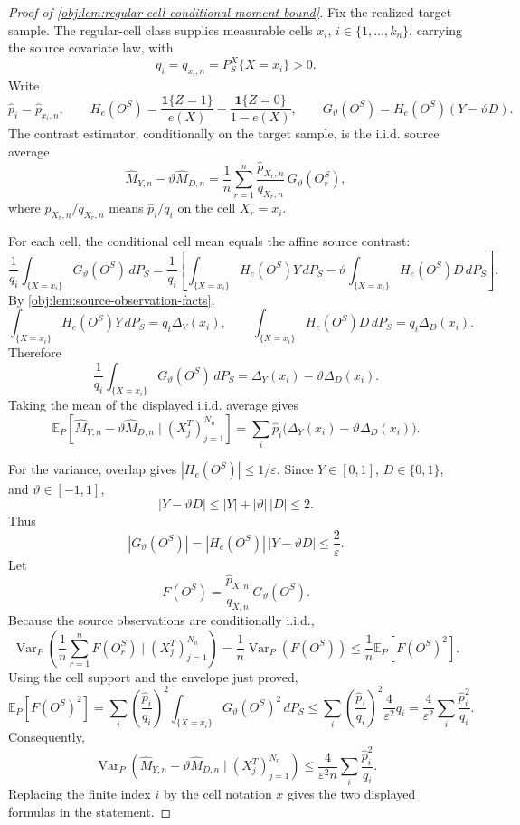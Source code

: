 \documentclass[11pt]{article}
\begin{document}
\begin{proof}[Proof of \cref{obj:lem:regular-cell-conditional-moment-bound}]
Fix the realized target sample. The regular-cell class supplies measurable cells \(x_i\), \(i\in\{1,\ldots,k_n\}\), carrying the source covariate law, with
\[
q_i=q_{x_i,n}=P_S^X\{X=x_i\}>0 .
\] %
Write
\[
\widehat p_i=\widehat p_{x_i,n},
\qquad
H_e(O^S)=\frac{\mathbf 1\{Z=1\}}{e(X)}
-\frac{\mathbf 1\{Z=0\}}{1-e(X)},
\qquad
G_\vartheta(O^S)=H_e(O^S)(Y-\vartheta D).
\]
The contrast estimator, conditionally on the target sample, is the i.i.d. source average
\[
\widehat M_{Y,n}-\vartheta\widehat M_{D,n}
=
\frac1n\sum_{r=1}^n
\frac{\widehat p_{X_r,n}}{q_{X_r,n}}\,
G_\vartheta(O_r^S),
\]
where \(\widehat p_{X_r,n}/q_{X_r,n}\) means \(\widehat p_i/q_i\) on the cell \(X_r=x_i\). %

For each cell, the conditional cell mean equals the affine source contrast:
\[
\frac1{q_i}
\int_{\{X=x_i\}}G_\vartheta(O^S)\,dP_S
=
\frac1{q_i}
\left[
\int_{\{X=x_i\}}H_e(O^S)Y\,dP_S
-
\vartheta
\int_{\{X=x_i\}}H_e(O^S)D\,dP_S
\right].
\] %
By \cref{obj:lem:source-observation-facts},
\[
\int_{\{X=x_i\}}H_e(O^S)Y\,dP_S
=
q_i\Delta_Y(x_i),
\qquad
\int_{\{X=x_i\}}H_e(O^S)D\,dP_S
=
q_i\Delta_D(x_i).
\]
Therefore
\[
\frac1{q_i}
\int_{\{X=x_i\}}G_\vartheta(O^S)\,dP_S
=
\Delta_Y(x_i)-\vartheta\Delta_D(x_i).
\] %
Taking the mean of the displayed i.i.d. average gives
\[
\mathbb E_P\!\left[
\widehat M_{Y,n}-\vartheta\widehat M_{D,n}
\mid (X_j^T)_{j=1}^{N_n}
\right]
=
\sum_i
\widehat p_i\bigl(\Delta_Y(x_i)-\vartheta\Delta_D(x_i)\bigr).
\] %

For the variance, overlap gives \(|H_e(O^S)|\le1/\varepsilon\). Since \(Y\in[0,1]\), \(D\in\{0,1\}\), and \(\vartheta\in[-1,1]\),
\[
|Y-\vartheta D|
\le |Y|+|\vartheta|\,|D|
\le 2 .
\]
Thus
\[
|G_\vartheta(O^S)|
=
|H_e(O^S)|\,|Y-\vartheta D|
\le
\frac2\varepsilon .
\] %
Let
\[
F(O^S)=\frac{\widehat p_{X,n}}{q_{X,n}}\,G_\vartheta(O^S).
\]
Because the source observations are conditionally i.i.d.,
\[
\operatorname{Var}_P\!\left(
\frac1n\sum_{r=1}^n F(O_r^S)
\mid (X_j^T)_{j=1}^{N_n}
\right)
=
\frac1n\operatorname{Var}_P(F(O^S))
\le
\frac1n\mathbb E_P[F(O^S)^2].
\] %
Using the cell support and the envelope just proved,
\[
\mathbb E_P[F(O^S)^2]
=
\sum_i
\left(\frac{\widehat p_i}{q_i}\right)^2
\int_{\{X=x_i\}}G_\vartheta(O^S)^2\,dP_S
\le
\sum_i
\left(\frac{\widehat p_i}{q_i}\right)^2
\frac4{\varepsilon^2}q_i
=
\frac4{\varepsilon^2}
\sum_i\frac{\widehat p_i^2}{q_i}.
\] %
Consequently,
\[
\operatorname{Var}_P\!\left(
\widehat M_{Y,n}-\vartheta\widehat M_{D,n}
\mid (X_j^T)_{j=1}^{N_n}
\right)
\le
\frac4{\varepsilon^2 n}
\sum_i\frac{\widehat p_i^2}{q_i}.
\] %
Replacing the finite index \(i\) by the cell notation \(x\) gives the two displayed formulas in the statement. %
\end{proof}
\end{document}
